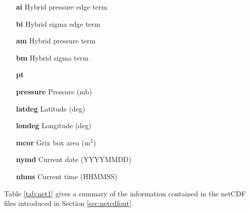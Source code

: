 \begin{itemize} 
\item[{\bf ai}] Hybrid pressure edge term
\item[{\bf bi}] Hybrid sigma edge term
\item[{\bf am}] Hybrid pressure term
\item[{\bf bm}] Hybrid sigma term
\item[{\bf pt}]
\item[{\bf pressure}] Pressure (mb)
\item[{\bf latdeg}] Latitude (deg)
\item[{\bf londeg}] Longitude (deg)
\item[{\bf mcor}] Grix box area (m$^2$)
\item[{\bf nymd}] Current date (YYYYMMDD)
\item[{\bf nhms}] Current time (HHMMSS)
\end{itemize}

Table \ref{tab:net1} gives a summary of the information contained in
the netCDF files introduced in Section \ref{sec:netcdfout}. 
%

